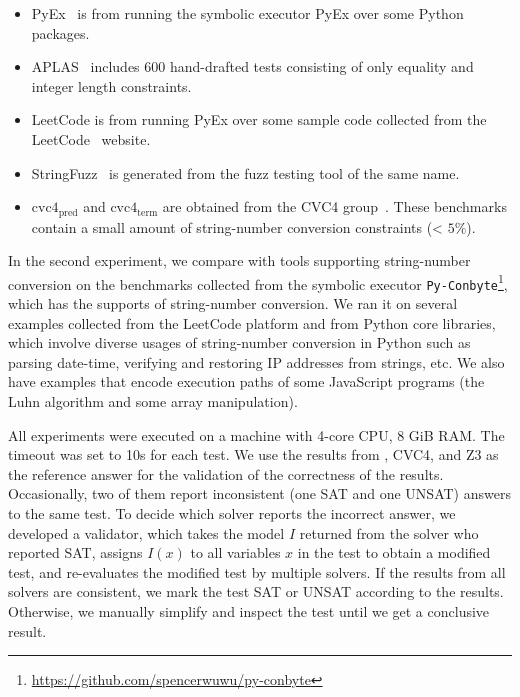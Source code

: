 \begin{itemize}
	\item PyEx~\cite{pyex} is from running the symbolic executor PyEx over some Python packages.
	
	\smallskip
	
	
	\item APLAS~\cite{aplas} includes 600 hand-drafted tests consisting of only equality and integer length constraints.
	
	
		\smallskip


	\item LeetCode is from running PyEx over some sample code collected from the LeetCode~\cite{LeetCode} website.
	
		\smallskip



	\item StringFuzz~\cite{blotsky2018stringfuzz}  is generated from the fuzz testing tool of the same name.
	
		\smallskip

	\item $\text{cvc4}_{\text{pred}}$ and $\text{cvc4}_{\text{term}}$ are obtained from the CVC4 group~\cite{termEQ}. These benchmarks contain a small amount of string-number conversion constraints (< $5\%$).
\end{itemize}

In the second experiment, we compare with tools supporting string-number conversion on the benchmarks collected from the symbolic executor \texttt{Py-Conbyte}\footnote{\url{https://github.com/spencerwuwu/py-conbyte}}, which has the supports of string-number conversion. We ran it on several examples collected from the LeetCode platform and from Python core libraries, which involve diverse usages of string-number conversion in Python such as parsing date-time, verifying and restoring IP addresses from strings, etc. We also have examples that encode execution paths of some JavaScript programs (the Luhn algorithm and some array manipulation).

All experiments were executed on a machine with 4-core CPU, 8 GiB RAM. The timeout was set to 10s for each test.
We use the results from {\tool}, CVC4, and Z3 as the reference answer for the validation of the correctness of the results. Occasionally, two of them report inconsistent (one SAT and one UNSAT) answers to the same test. To decide which solver reports the incorrect answer, we developed a validator, which takes the model $I$ returned from the solver who reported SAT, assigns $I(x)$ to all variables $x$ in the test to obtain a modified test, and re-evaluates the modified test by multiple solvers. If the results from all solvers are consistent, we mark the test SAT or UNSAT according to the results. Otherwise, we manually simplify and inspect the test until we get a conclusive result. 

